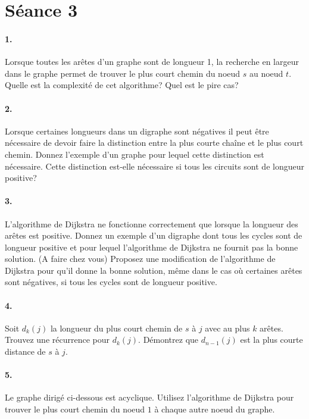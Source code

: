 \section{Séance 3}

\paragraph{1. } Lorsque toutes les arêtes d'un graphe sont de longueur 1, la recherche en largeur dans le graphe permet de trouver le plus court chemin du noeud $s$ au noeud $t$. Quelle est la complexité de cet algorithme? Quel est le pire cas?

\paragraph{2. } Lorsque certaines longueurs dans un digraphe sont négatives il peut être nécessaire de devoir faire la distinction entre la plus courte chaîne et le plus court chemin. Donnez l'exemple d'un graphe pour lequel cette distinction est nécessaire. Cette distinction est-elle nécessaire si tous les circuits sont de longueur positive?

\paragraph{3. } L'algorithme de Dijkstra ne fonctionne correctement que lorsque la longueur des arêtes est positive. Donnez un exemple d'un digraphe dont tous les cycles sont de longueur positive et pour lequel l'algorithme de Dijkstra ne fournit pas la bonne solution. (A faire chez vous) Proposez une modification de l'algorithme de Dijkstra pour qu'il donne la bonne solution, même dans le cas où certaines arêtes sont négatives, si tous les cycles sont de longueur positive.

\paragraph{4. } Soit $d_k(j)$ la longueur du plus court chemin de $s$ à $j$ avec au plus $k$ arêtes. Trouvez une récurrence pour $d_k(j)$. Démontrez que $d_{n-1}(j)$ est la plus courte distance de $s$ à $j$.

\paragraph{5. } Le graphe dirigé ci-dessous est acyclique. Utilisez l'algorithme de Dijkstra pour trouver le plus court chemin du noeud $1$ à chaque autre noeud du graphe.


